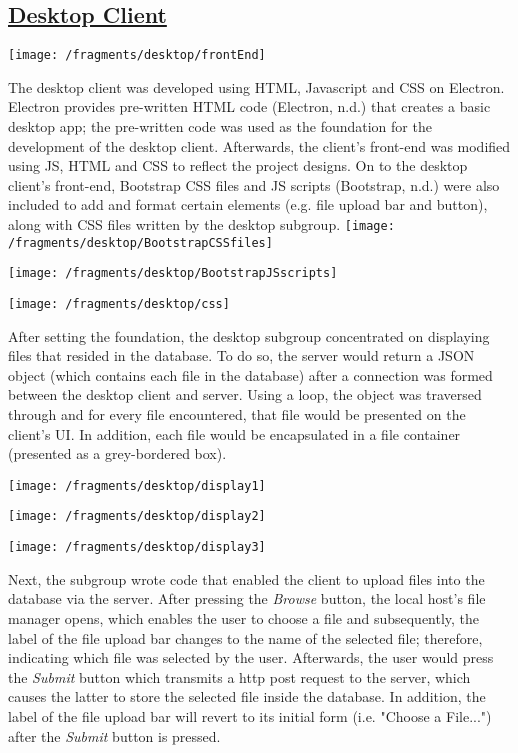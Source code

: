 \documentclass{article}
\begin{document}
\subsection{\underline{Desktop Client}}
\texttt{[image: /fragments/desktop/frontEnd]}

The desktop client was developed using  HTML, Javascript and CSS on Electron. Electron provides pre-written HTML code (Electron, n.d.) that creates a basic desktop app; the pre-written code was used as the foundation for the development of the desktop client. Afterwards, the client's front-end was modified using JS, HTML and CSS to reflect the project designs. On to the desktop client's front-end, Bootstrap CSS files and JS scripts (Bootstrap, n.d.) were also included to add and format certain elements (e.g. file upload bar and button), along with CSS files written by the desktop subgroup.
\texttt{[image: /fragments/desktop/BootstrapCSSfiles]}

\texttt{[image: /fragments/desktop/BootstrapJSscripts]}

\texttt{[image: /fragments/desktop/css]}

After setting the foundation, the desktop subgroup concentrated on displaying files that resided in the database. To do so, the server would return a JSON object (which contains each file in the database) after a connection was formed between the desktop client and server. Using a loop, the object was traversed through and for every file encountered, that file would be presented on the client's UI. In addition, each file would be encapsulated in a file container (presented as a grey-bordered box).

\texttt{[image: /fragments/desktop/display1]}

\texttt{[image: /fragments/desktop/display2]}

\texttt{[image: /fragments/desktop/display3]}

Next, the subgroup wrote code that enabled the client to upload files into the database via the server. After pressing the \textit{Browse} button, the local host's file manager opens, which enables the user to choose a file and subsequently, the label of the file upload bar changes to the name of the selected file; therefore, indicating which file was selected by the user. Afterwards, the user would press the \textit{Submit} button which transmits a http post request to the server, which causes the latter to store the selected file inside the database. In addition, the label of the file upload bar will revert to its initial form (i.e. "Choose a File...") after the \textit{Submit} button is pressed.
\end{document}
